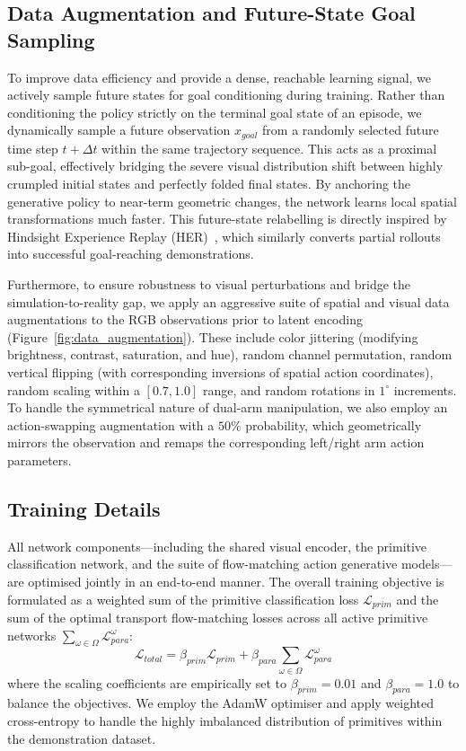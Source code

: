 \documentclass[journal]{IEEEtran}
\begin{document}
\subsection{Data Augmentation and Future-State Goal Sampling}
To improve data efficiency and provide a dense, reachable learning signal, we actively sample future states for goal conditioning during training. Rather than conditioning the policy strictly on the terminal goal state of an episode, we dynamically sample a future observation $x_{goal}$ from a randomly selected future time step $t + \Delta t$ within the same trajectory sequence. This acts as a proximal sub-goal, effectively bridging the severe visual distribution shift between highly crumpled initial states and perfectly folded final states. By anchoring the generative policy to near-term geometric changes, the network learns local spatial transformations much faster. This future-state relabelling is directly inspired by Hindsight Experience Replay (HER)~\cite{andrychowicz2017hindsight}, which similarly converts partial rollouts into successful goal-reaching demonstrations.

Furthermore, to ensure robustness to visual perturbations and bridge the simulation-to-reality gap, we apply an aggressive suite of spatial and visual data augmentations to the RGB observations prior to latent encoding (Figure~\ref{fig:data_augmentation}). These include color jittering (modifying brightness, contrast, saturation, and hue), random channel permutation, random vertical flipping (with corresponding inversions of spatial action coordinates), random scaling within a $[0.7, 1.0]$ range, and random rotations in $1^\circ$ increments. To handle the symmetrical nature of dual-arm manipulation, we also employ an action-swapping augmentation with a $50\%$ probability, which geometrically mirrors the observation and remaps the corresponding left/right arm action parameters.

\subsection{Training Details}
All network components—including the shared visual encoder, the primitive classification network, and the suite of flow-matching action generative models—are optimised jointly in an end-to-end manner. The overall training objective is formulated as a weighted sum of the primitive classification loss $\mathcal{L}_{prim}$ and the sum of the optimal transport flow-matching losses across all active primitive networks $\sum_{\omega \in \Omega} \mathcal{L}_{para}^{\omega}$:
$$\mathcal{L}_{total} = \beta_{prim} \mathcal{L}_{prim} + \beta_{para} \sum_{\omega \in \Omega} \mathcal{L}_{para}^{\omega}$$
where the scaling coefficients are empirically set to $\beta_{prim} = 0.01$ and $\beta_{para} = 1.0$ to balance the objectives. We employ the AdamW optimiser and apply weighted cross-entropy to handle the highly imbalanced distribution of primitives within the demonstration dataset. 
\end{document}
